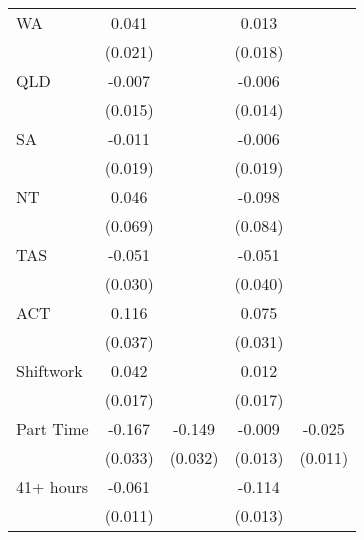 {\begin{tabular}{l*{4}{c}}
WA                  &       0.041\sym{*}  &                     &       0.013         &                     \\
                    &     (0.021)         &                     &     (0.018)         &                     \\
QLD                 &      -0.007         &                     &      -0.006         &                     \\
                    &     (0.015)         &                     &     (0.014)         &                     \\
SA                  &      -0.011         &                     &      -0.006         &                     \\
                    &     (0.019)         &                     &     (0.019)         &                     \\
NT                  &       0.046         &                     &      -0.098         &                     \\
                    &     (0.069)         &                     &     (0.084)         &                     \\
TAS                 &      -0.051\sym{*}  &                     &      -0.051         &                     \\
                    &     (0.030)         &                     &     (0.040)         &                     \\
ACT                 &       0.116\sym{***}&                     &       0.075\sym{**} &                     \\
                    &     (0.037)         &                     &     (0.031)         &                     \\
Shiftwork           &       0.042\sym{**} &                     &       0.012         &                     \\
                    &     (0.017)         &                     &     (0.017)         &                     \\
Part Time           &      -0.167\sym{***}&      -0.149\sym{***}&      -0.009         &      -0.025\sym{**} \\
                    &     (0.033)         &     (0.032)         &     (0.013)         &     (0.011)         \\
41+ hours           &      -0.061\sym{***}&                     &      -0.114\sym{***}&                     \\
                    &     (0.011)         &                     &     (0.013)         &                     \\

\end{tabular}}
